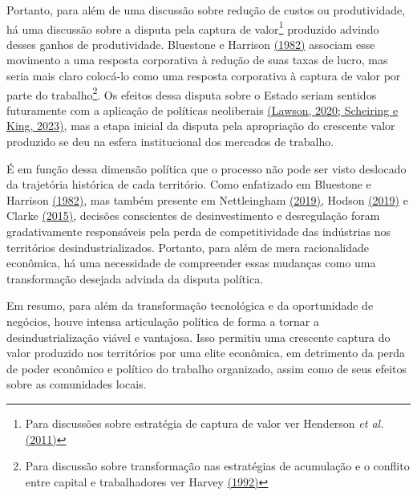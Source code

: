 Portanto, para além de uma discussão sobre redução de custos ou
produtividade, há uma discussão sobre a disputa pela captura de
valor\footnote{Para discussões sobre estratégia de captura de valor ver
  Henderson \emph{et al.}
  \href{https://www.zotero.org/google-docs/?FvfDr5}{(2011)}} produzido
advindo desses ganhos de produtividade. Bluestone e Harrison
\href{https://www.zotero.org/google-docs/?MdzJNx}{(1982)} associam esse
movimento a uma resposta corporativa à redução de suas taxas de lucro,
mas seria mais claro colocá-lo como uma resposta corporativa à captura
de valor por parte do trabalho\footnote{Para discussão sobre
  transformação nas estratégias de acumulação e o conflito entre capital
  e trabalhadores ver Harvey
  \href{https://www.zotero.org/google-docs/?eJL7Z3}{(1992)}}. Os efeitos
dessa disputa sobre o Estado seriam sentidos futuramente com a aplicação
de políticas neoliberais
\href{https://www.zotero.org/google-docs/?26mgUJ}{(Lawson, 2020;
Scheiring e King, 2023)}, mas a etapa inicial da disputa pela
apropriação do crescente valor produzido se deu na esfera institucional
dos mercados de trabalho.

É em função dessa dimensão política que o processo não pode ser visto
deslocado da trajetória histórica de cada território. Como enfatizado em
Bluestone e Harrison
\href{https://www.zotero.org/google-docs/?jPNmiv}{(1982)}, mas também
presente em Nettleingham
\href{https://www.zotero.org/google-docs/?fyB4VM}{(2019)}, Hodson
\href{https://www.zotero.org/google-docs/?G2DsO2}{(2019)} e Clarke
\href{https://www.zotero.org/google-docs/?u62AOc}{(2015)}, decisões
conscientes de desinvestimento e desregulação foram gradativamente
responsáveis pela perda de competitividade das indústrias nos
territórios desindustrializados. Portanto, para além de mera
racionalidade econômica, há uma necessidade de compreender essas
mudanças como uma transformação desejada advinda da disputa política.

Em resumo, para além da transformação tecnológica e da oportunidade de
negócios, houve intensa articulação política de forma a tornar a
desindustrialização viável e vantajosa. Isso permitiu uma crescente
captura do valor produzido nos territórios por uma elite econômica, em
detrimento da perda de poder econômico e político do trabalho
organizado, assim como de seus efeitos sobre as comunidades locais.

